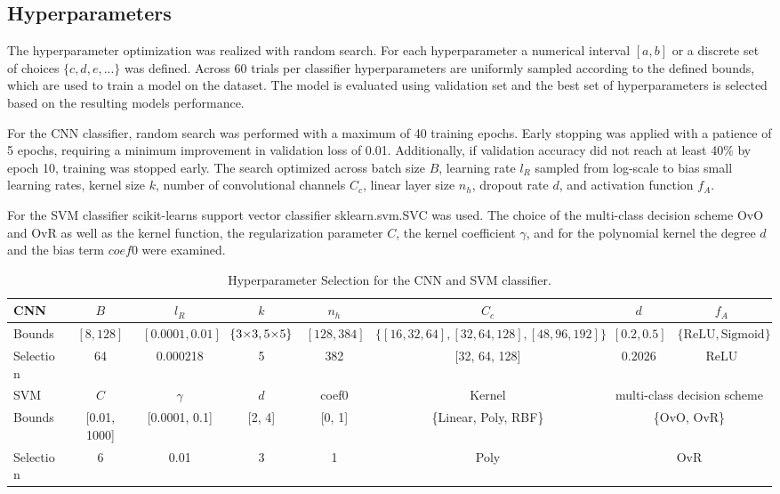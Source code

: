 \documentclass[a4, 10 pt, conference]{ieeeconf}  %
\begin{document}
\subsection{Hyperparameters}
\label{subsec:hyperparameters}

The hyperparameter optimization was realized with random search. For each
hyperparameter a numerical interval $[a, b]$ or a discrete set of choices $\{c,d,e,...\}$
was defined. Across 60 trials per classifier hyperparameters are uniformly sampled according
to the defined bounds, which are used to train a model on the dataset. The model is
evaluated using validation set and the best set of hyperparameters is selected
based on the resulting models performance.

For the CNN classifier, random search was performed with a maximum of 40 training epochs.
Early stopping was applied with a patience of 5 epochs, requiring a minimum improvement in
validation loss of 0.01. Additionally, if validation accuracy did not reach at least 40\% by
epoch 10, training was stopped early. The search optimized across batch size $B$, learning rate
$l_R$ sampled from log-scale to bias small learning rates, kernel size $k$, number of convolutional channels $C_c$, linear layer size $n_h$, dropout
rate $d$, and activation function $f_A$.

For the SVM classifier scikit-learns support vector classifier sklearn.svm.SVC was used.
The choice of the multi-class decision scheme OvO and OvR as well as the kernel function,
the regularization parameter $C$, the kernel coefficient $\gamma$, and for the
polynomial kernel the degree $d$ and the bias term $coef0$ were examined.

\begin{table}[b]
  \centering
  \begin{tabular}{|l|c|c|c|c|c|c|c|}
    \hline
    CNN & $B$ & $l_R$ & $k$ & $n_h$ & $C_c$ & $d$ & $f_A$ \\
    \hline
    Bounds & $[8,128]$ & $[0.0001, 0.01]$ & $\{\text{3\texttimes3}, \text{5\texttimes5}\}$ & $[128,384]$ & $\{[16,32,64],[32,64,128],[48,96,192]\}$ & $[0.2,0.5]$ & $\{\text{ReLU}, \text{Sigmoid}\}$ \\
    Selection & 64 & 0.000218 & 5\texttimes5 & 382 & [32, 64, 128] & 0.2026 & ReLU\\
    \hline
    SVM & $C$ & $\gamma$ & $d$ & coef0 & Kernel & \multicolumn{2}{c|}{multi-class decision scheme} \\
    \hline
    Bounds & [0.01, 1000] & [0.0001, 0.1] & [2, 4] & [0, 1] & \{Linear, Poly, RBF\} & \multicolumn{2}{c|}{\{OvO, OvR\}} \\
    Selection & 6 & 0.01 & 3 & 1 & Poly & \multicolumn{2}{c|}{OvR} \\
    \hline
  \end{tabular}
  \caption{Hyperparameter Selection for the CNN and SVM classifier.}
  \label{fig:hyperparameter_selection}
\end{table}
\end{document}
